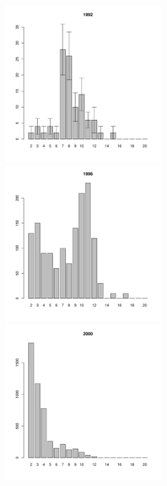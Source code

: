 	\begin{figure}[hp]

	\begin{minipage}[b]{.3\linewidth}
	\begin{center}
	\includegraphics[width=60mm]{../White_Sea/Luvenga_Goreliy/middle2_1992_.pdf}	
	\end{center}
	\end{minipage}
	\hfil %
	\begin{minipage}[b]{.3\linewidth}
	\begin{center}
	\includegraphics[width=60mm]{../White_Sea/Luvenga_Goreliy/middle2_1996_.pdf}
	\end{center}
	\end{minipage}
	\hfil %
	\begin{minipage}[b]{.3\linewidth}
	\begin{center}
\includegraphics[width=60mm]{../White_Sea/Luvenga_Goreliy/middle2_2000_.pdf}

\end{center}
\end{minipage}
\end{figure}
